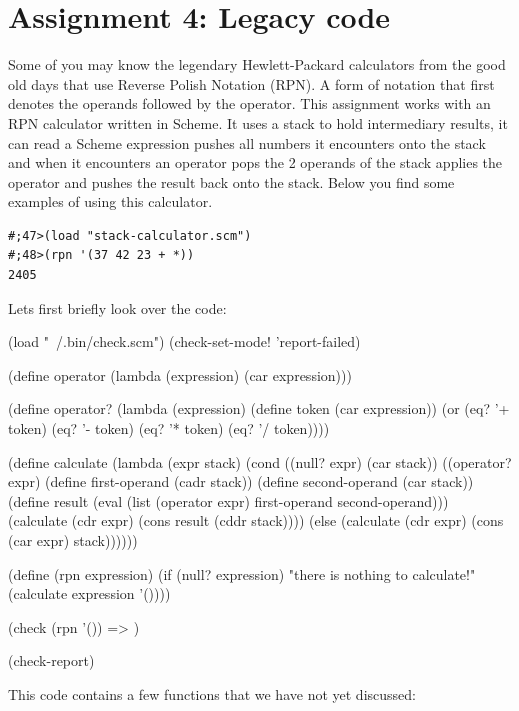 \documentclass[12pt,a4paper,english,twoside]{article}
\begin{document}
\section{Assignment 4: Legacy code}
Some of you may know the legendary Hewlett-Packard calculators from the good 
old days that use Reverse Polish Notation (RPN). A form of notation that first 
denotes the operands followed by the operator. This assignment works with an
RPN calculator written in Scheme. It uses a stack to hold intermediary 
results, it can read a Scheme expression pushes all numbers it encounters onto 
the stack and when it encounters an operator pops the 2 operands of the stack 
applies the operator and pushes the result back onto the stack. Below you find 
some examples of using this calculator.
\begin{lstlisting}
#;47>(load "stack-calculator.scm")
#;48>(rpn '(37 42 23 + *))
2405
\end{lstlisting}
Lets first briefly look over the code:
\begin{schemecode}
(load "~/.bin/check.scm")
(check-set-mode! 'report-failed)

(define operator
  (lambda (expression) 
    (car expression)))

(define operator? 
  (lambda (expression)
    (define token (car expression))
    (or (eq? '+ token)
        (eq? '- token)
        (eq? '* token)
        (eq? '/ token))))

(define calculate 
  (lambda (expr stack)
    (cond ((null? expr) (car stack))
          ((operator? expr)
            (define first-operand (cadr stack))
            (define second-operand (car stack))
            (define result (eval (list 
                                   (operator expr) 
                                   first-operand 
                                   second-operand)))
            (calculate (cdr expr) (cons result (cddr stack))))
          (else (calculate (cdr expr) (cons (car expr) stack))))))

(define (rpn expression)
  (if (null? expression)
    "there is nothing to calculate!"
    (calculate expression '())))

(check (rpn '()) => )

(check-report)
\end{schemecode}
This code contains a few functions that we have not yet discussed:
\end{document}
